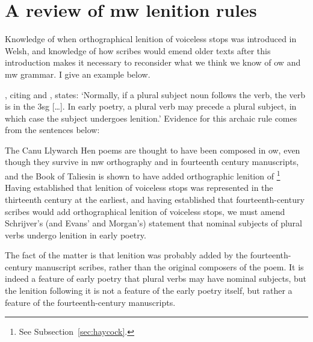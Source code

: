 \section{A review of \gls{mw} lenition rules}
\label{sec:cons-other-ideas}
Knowledge of when orthographical lenition of voiceless stops was introduced in Welsh, and knowledge of how scribes would emend older texts after this introduction makes it necessary to reconsider what we think we know of \gls{ow} and \gls{mw} grammar. I give an example below.

\Textcite[2]{schrijver_free_2010}, citing \textcite[18, 179]{evans_grammar_1964} and \textcite[193n]{morgan_y_1952}, states:
`Normally, if a plural subject noun follows the verb, the verb is in the 3sg […]. In early poetry, a plural verb may precede a plural subject, in which case the subject undergoes lenition.' Evidence for this archaic rule comes from the sentences below:
\begin{mwl}
\end{mwl}

The Canu Llywarch Hen poems are thought to have been composed in \gls{ow}, even though they survive in \gls{mw} orthography and in fourteenth century manuscripts, and the Book of Taliesin is shown to have added orthographic lenition of \footnote{See Subsection~\ref{sec:haycock}.} Having established that  lenition of voiceless stops was represented in the thirteenth century at the earliest, and having established that fourteenth-century scribes would add orthographical lenition of voiceless stops, we must amend Schrijver's (and Evans' and Morgan's) statement that nominal subjects of plural verbs undergo lenition in early poetry.

The fact of the matter is that lenition was probably added by the fourteenth-century manuscript scribes, rather than the original composers of the poem. It is indeed a feature of early poetry that plural verbs may have nominal subjects, but the lenition following it is not a feature of the early poetry itself, but rather a feature of the fourteenth-century manuscripts.

